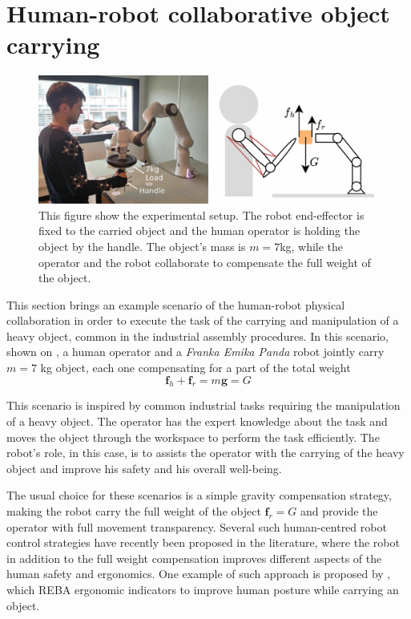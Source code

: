 \section{Human-robot collaborative object carrying}
\label{ch:human_robot_carrying}

\begin{figure}[!h]
    \centering
    \includegraphics[width=\linewidth]{Papers/images/exp2_real_schema.jpg}
    \caption{This figure show the experimental setup. The robot end-effector is fixed to the carried object and the human operator is holding the object by the handle. The object's mass is $m=7$kg, while the operator and the robot collaborate to compensate the full weight of the object.}
    \label{fig:exp2_real_schema}
\end{figure}
This section brings an example scenario of the human-robot physical collaboration in order to execute the task of the carrying and manipulation of a heavy object, common in the industrial assembly procedures. In this scenario, shown on , a human operator and a \textit{Franka Emika Panda} robot jointly carry $m\!=\!7$ kg object, each one compensating for a part of the total weight 
\begin{equation}
    \bm{f}_h  + \bm{f}_r = m\bm{g} = G
\end{equation}


This scenario is inspired by common industrial tasks requiring the manipulation of a heavy object. The operator has the expert knowledge about the task and moves the object through the workspace to perform the task efficiently. The robot's role, in this case, is to assists the operator with the carrying of the heavy object and improve his safety and his overall well-being.

The usual choice for these scenarios is a simple gravity compensation strategy, making the robot carry the full weight of the object $\bm{f}_r = G$ and provide the operator with full movement transparency. Several such human-centred robot control strategies have recently been proposed in the literature, where the robot in addition to the full weight compensation improves different aspects of the human safety and ergonomics. One example of such approach is proposed by \citet{ferraguti2020unified}, which REBA \cite{reba} ergonomic indicators to improve human posture while carrying an object. 

